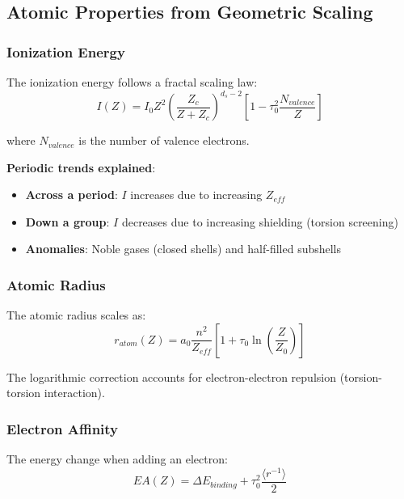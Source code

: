 \subsection{Atomic Properties from Geometric Scaling}

\subsubsection{Ionization Energy}

The ionization energy follows a fractal scaling law:
\begin{equation}
    I(Z) = I_0 Z^2 \left(\frac{Z_c}{Z + Z_c}\right)^{d_s-2} \left[1 - \tau_0^2 \frac{N_{valence}}{Z}\right]
\end{equation}

where $N_{valence}$ is the number of valence electrons.

\textbf{Periodic trends explained}:
\begin{itemize}
    \item \textbf{Across a period}: $I$ increases due to increasing $Z_{eff}$
    \item \textbf{Down a group}: $I$ decreases due to increasing shielding (torsion screening)
    \item \textbf{Anomalies}: Noble gases (closed shells) and half-filled subshells
\end{itemize}

\subsubsection{Atomic Radius}

The atomic radius scales as:
\begin{equation}
    r_{atom}(Z) = a_0 \frac{n^2}{Z_{eff}} \left[1 + \tau_0 \ln\left(\frac{Z}{Z_0}\right)\right]
\end{equation}

The logarithmic correction accounts for electron-electron repulsion (torsion-torsion interaction).

\subsubsection{Electron Affinity}

The energy change when adding an electron:
\begin{equation}
    EA(Z) = \Delta E_{binding} + \tau_0^2 \frac{\langle r^{-1} \rangle}{2}
\end{equation}

